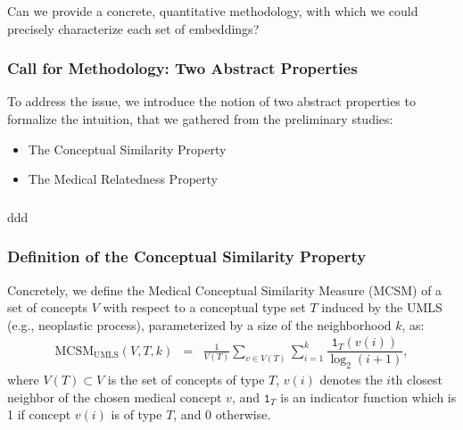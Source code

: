 \documentclass{beamer}
\begin{document}
\begin{frame}
\begin{center}
Can we provide a concrete, quantitative methodology,
with which we could precisely characterize each set of embeddings?
\end{center}
\end{frame}

\begin{frame}
\frametitle{Call for Methodology: Two Abstract 
Properties}
\begin{center}
To address the issue, we introduce the notion of
two abstract properties to formalize the
intuition, that we gathered from the preliminary 
studies:

\bigskip

\begin{itemize}
\item The Conceptual Similarity Property

\bigskip

\item The Medical Relatedness Property
\end{itemize}
\end{center}
\end{frame}

\begin{frame}
\frametitle{}
ddd
\end{frame}

\begin{frame}
\frametitle{Definition of the 
Conceptual Similarity Property}

Concretely, we define the Medical Conceptual Similarity Measure (MCSM) 
of a set of concepts $V$
with respect to a conceptual type set $T$ induced by the UMLS (e.g.,
neoplastic process), parameterized by 
a size of the neighborhood $k$, as: %
\begin{eqnarray*}
\text{MCSM}_{\text{UMLS}}(V,T,k) &=& \frac{1}{V(T)}\sum_{v \in V(T)} \sum_{i=1}^{k} \dfrac{ \mathtt{1}_{T}(v(i)) }{\log_2(i+1)},
\end{eqnarray*}
where $V(T)\subset V$ is the set of concepts of type $T$, $v(i)$ denotes the $i$th closest neighbor of the chosen medical concept $v$,
and $\mathtt{1}_{T}$ is an indicator function which is 1 if concept
$v(i)$ is of type $T$, and $0$ otherwise.
\end{frame}
\end{document}
